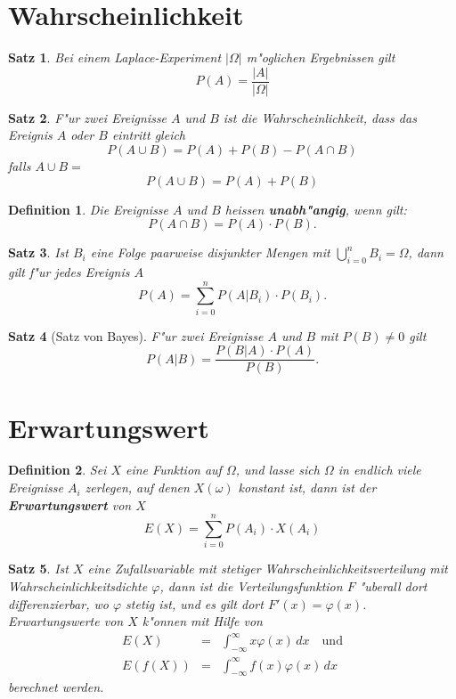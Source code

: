 \documentclass[ngerman, a4paper, 10pt, twocolumn, DIV20, headings=small]{scrartcl}
\newtheorem{definition}{Definition}
\newtheorem{satz}{Satz}
\begin{document}
\section{Wahrscheinlichkeit}
\label{sec:wahrscheinlichkeit}

\begin{satz}
  Bei einem Laplace-Experiment $| \Omega |$ m"oglichen Ergebnissen gilt
\[
P(A) = \frac{|A|}{|\Omega|}
\]
\end{satz}

\begin{satz}
F"ur zwei Ereignisse $A$ und $B$ ist die Wahrscheinlichkeit, dass das Ereignis $A$ oder $B$ eintritt gleich
\[
P(A\cup B) = P(A) + P(B) - P(A\cap B)
\]
falls $ A \cup B = {} $
\[
P(A\cup B) = P(A) + P(B)
\]
\end{satz}

\begin{definition}
Die Ereignisse $A$ und $B$ heissen {\bf unabh"angig}, wenn gilt:
\[
P(A\cap B) = P(A)\cdot P(B).
\]
\end{definition}

\begin{satz}
Ist $B_i$ eine Folge paarweise disjunkter Mengen mit $\bigcup_{i=0}^{n}B_i=\Omega$, dann gilt f"ur jedes Ereignis $A$
\[
P(A)=\sum_{i=0}^{n}P(A|B_i)\cdot P(B_i).
\]
\end{satz}

\begin{satz}[Satz von Bayes]
F"ur zwei Ereignisse $A$ und $B$ mit $P(B)\ne0$ gilt
\[
P(A|B)=\frac{P(B|A)\cdot P(A)}{P(B)}.
\]
\end{satz}

\section{Erwartungswert}
\label{sec:erwartungswert}


\begin{definition}
Sei $X$ eine Funktion auf $\Omega$, und lasse sich $\Omega$ in endlich
viele Ereignisse $A_i$ zerlegen, auf denen $X(\omega)$ konstant ist,
dann ist der {\bf Erwartungswert} von $X$
\[
E(X)=\sum_{i=0}^nP(A_i)\cdot X(A_i)
\]
\end{definition}

\begin{satz}
Ist $X$ eine Zufallsvariable mit stetiger
Wahrscheinlichkeitsverteilung mit Wahrscheinlichkeitsdichte
$\varphi$, dann
ist die Verteilungsfunktion $F$ "uberall dort differenzierbar, wo
$\varphi$ stetig ist, und es gilt dort
$F'(x)=\varphi(x)$.
Erwartungswerte von $X$ k"onnen mit Hilfe von
\begin{eqnarray*}
E(X)&=&\int_{-\infty}^{\infty}x\varphi(x)\,dx\quad\text{und}\\
E(f(X))&=&\int_{-\infty}^{\infty}f(x)\varphi(x)\,dx
\end{eqnarray*}
berechnet werden.
\end{satz}
\end{document}
